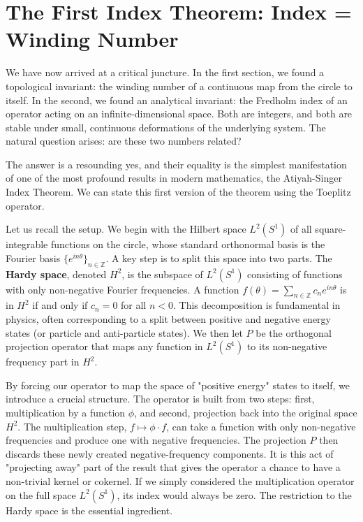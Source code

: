 \section{The First Index Theorem: Index = Winding Number}
\label{sec:first_index_theorem}

We have now arrived at a critical juncture.
In the first section, we found a topological invariant: the winding number of a continuous map from the circle to itself.
In the second, we found an analytical invariant: the Fredholm index of an operator acting on an infinite-dimensional space.
Both are integers, and both are stable under small, continuous deformations of the underlying system.
The natural question arises: are these two numbers related?

The answer is a resounding yes, and their equality is the simplest manifestation of one of the most profound results in modern mathematics, the Atiyah-Singer Index Theorem.
We can state this first version of the theorem using the Toeplitz operator.

Let us recall the setup.
We begin with the Hilbert space $L^2(S^1)$ of all square-integrable functions on the circle, whose standard orthonormal basis is the Fourier basis $\{e^{in\theta}\}_{n\in\mathbb{Z}}$.
A key step is to split this space into two parts.
The \textbf{Hardy space}, denoted $H^2$, is the subspace of $L^2(S^1)$ consisting of functions with only non-negative Fourier frequencies.
A function $f(\theta) = \sum_{n\in\mathbb{Z}} c_n e^{in\theta}$ is in $H^2$ if and only if $c_n = 0$ for all $n < 0$.
This decomposition is fundamental in physics, often corresponding to a split between positive and negative energy states (or particle and anti-particle states).
We then let $P$ be the orthogonal projection operator that maps any function in $L^2(S^1)$ to its non-negative frequency part in $H^2$.

By forcing our operator to map the space of "positive energy" states to itself, we introduce a crucial structure.
The operator is built from two steps: first, multiplication by a function $\phi$, and second, projection back into the original space $H^2$.
The multiplication step, $f \mapsto \phi \cdot f$, can take a function with only non-negative frequencies and produce one with negative frequencies.
The projection $P$ then discards these newly created negative-frequency components.
It is this act of "projecting away" part of the result that gives the operator a chance to have a non-trivial kernel or cokernel.
If we simply considered the multiplication operator on the full space $L^2(S^1)$, its index would always be zero.
The restriction to the Hardy space is the essential ingredient.

